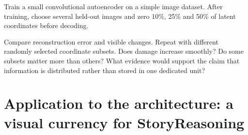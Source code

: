 \begin{optionalexercise}[title={Optional coding --- what survives the bottleneck?}]
Train a small convolutional autoencoder on a simple image dataset. After training, choose several held-out images and zero 10\%, 25\% and 50\% of latent coordinates before decoding.

Compare reconstruction error and visible changes. Repeat with different randomly selected coordinate subsets. Does damage increase smoothly? Do some subsets matter more than others? What evidence would support the claim that information is distributed rather than stored in one dedicated unit?
\end{optionalexercise}

\section{Application to the architecture: a visual currency for StoryReasoning}

